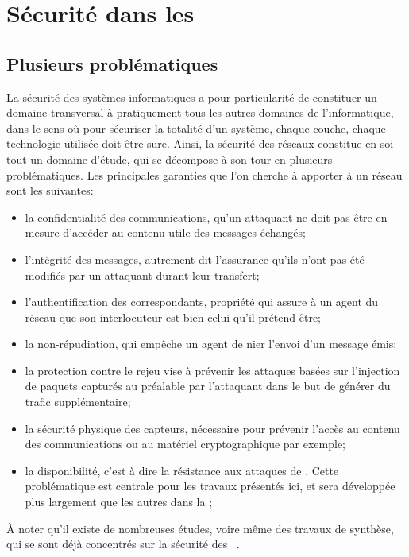 \section{Sécurité dans les \rcs}\label{ea:sec:secu}

\subsection{Plusieurs problématiques}

La sécurité des systèmes informatiques a pour particularité de constituer un domaine transversal à pratiquement tous les autres domaines de l'informatique, dans le sens où pour sécuriser la totalité d'un système, chaque couche, chaque technologie utilisée doit être sure.
Ainsi, la sécurité des réseaux constitue en soi tout un domaine d'étude, qui se décompose à son tour en plusieurs problématiques.
Les principales garanties que l'on cherche à apporter à un réseau sont les suivantes:
\begin{itemize}
    \item la confidentialité des communications, \cad qu'un attaquant ne doit pas être en mesure d'accéder au contenu utile des messages échangés;
    \item l'intégrité des messages, autrement dit l'assurance qu'ils n'ont pas été modifiés par un attaquant durant leur transfert;
    \item l'authentification des correspondants, propriété qui assure à un agent du réseau que son interlocuteur est bien celui qu'il prétend être;
    \item la non-répudiation, qui empêche un agent de nier l'envoi d'un message émis;
    \item la protection contre le rejeu vise à prévenir les attaques basées sur l'injection de paquets capturés au préalable par l'attaquant dans le but de générer du trafic supplémentaire;
    \item la sécurité physique des capteurs, nécessaire pour prévenir l'accès au contenu des communications ou au matériel cryptographique par exemple;
    \item la disponibilité, c'est à dire la résistance aux attaques de \dds. Cette problématique est centrale pour les travaux présentés ici, et sera développée plus largement que les autres dans la ;
\end{itemize}
À noter qu'il existe de nombreuses études, voire même des travaux de synthèse, qui se sont déjà concentrés sur la sécurité des \rcs~\cite{DYK12,AD14}.

